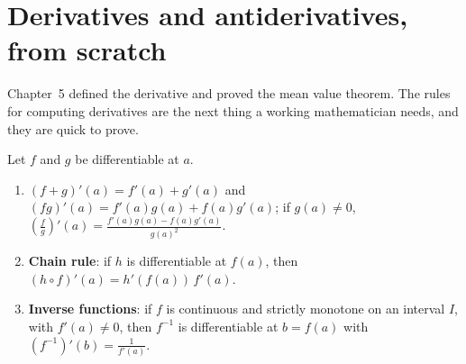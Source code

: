 
\section{Derivatives and antiderivatives, from scratch}

Chapter~5 defined the derivative and proved the mean value theorem. The rules for computing derivatives are the next thing a working mathematician
needs, and they are quick to prove.

\begin{propositionx}
Let $f$ and $g$ be differentiable at $a$.
\begin{enumerate}[label=(\alph*)]
\item $(f+g)'(a)=f'(a)+g'(a)$ and $(fg)'(a)=f'(a)g(a)+f(a)g'(a)$; if $g(a)\ne0$, $\left(\frac fg\right)'(a)=\frac{f'(a)g(a)-f(a)g'(a)}{g(a)^2}$.
\item \textbf{Chain rule}: if $h$ is differentiable at $f(a)$, then $(h\circ f)'(a)=h'(f(a))\,f'(a)$.
\item \textbf{Inverse functions}: if $f$ is continuous and strictly monotone on an interval $I$, with $f'(a)\ne0$, then $f^{-1}$ is differentiable at $b=f(a)$ with $(f^{-1})'(b)=\frac1{f'(a)}$.
\end{enumerate}
\end{propositionx}
